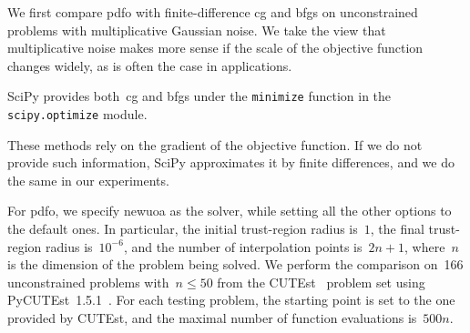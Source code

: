 \documentclass[smallextended]{svjour3}
\newcommand{\modified}[1]{#1}
\begin{document}
We first compare \gls{pdfo} with finite-difference \gls{cg} and \gls{bfgs} on unconstrained problems with multiplicative Gaussian noise.
We take the view that multiplicative noise makes more sense if the scale of the objective function changes widely, as is often the case in applications.

SciPy provides both~\gls{cg} and \gls{bfgs} under the \texttt{minimize} function in the \texttt{scipy.optimize} module.
\modified{
    These methods rely on the gradient of the objective function.
    If we do not provide such information, SciPy approximates it by finite differences, and we do the same in our experiments.
}
For \gls{pdfo}, we specify \gls{newuoa} as the solver, while setting all the other options to the default ones.
In particular, the initial trust-region radius is~$1$, the final trust-region radius is~$10^{-6}$, and the number of interpolation points is~$2n + 1$, \modified{where}~$n$ \modified{is} the dimension of the problem being solved.
We perform the comparison on~\modified{\num{166}} unconstrained problems with~$n \le 50$ from the CUTEst~\cite{Gould_Orban_Toint_2015} problem set using PyCUTEst~\modified{1.5.1}~\cite{Fowkes_Roberts_Burmen_2022}.
For each testing problem, the starting point is set to the one provided by CUTEst, and the maximal number of function evaluations is~$500n$.
\end{document}
